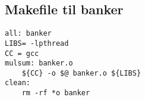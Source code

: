 \subsection{Makefile til banker}
\begin{lstlisting}
all: banker
LIBS= -lpthread
CC = gcc
mulsum: banker.o
	${CC} -o $@ banker.o ${LIBS}
clean:
	rm -rf *o banker
\end{lstlisting}